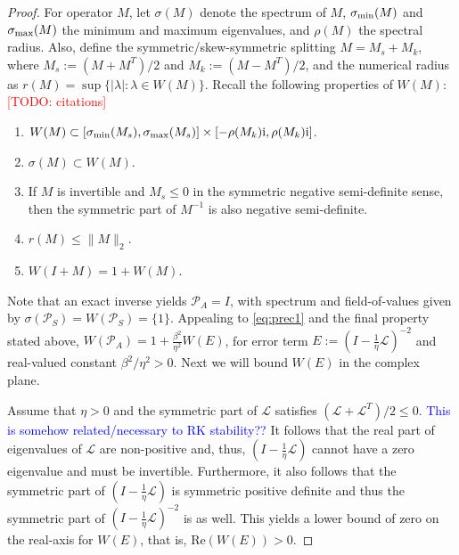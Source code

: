 \documentclass[review]{siamart}
\makeatletter
\newcommand{\tcb}{\textcolor{blue}}
\newcommand{\todo}[1]{\textcolor{red}{[TODO\@: #1]}}
\makeatother
\begin{document}
\begin{proof}
For operator $M$, let $\sigma(M)$ denote the spectrum of $M$, $\sigma_{\textnormal{min}}(M)$
and $\sigma_{\textnormal{max}}(M)$ the minimum and maximum eigenvalues, and $\rho(M)$
the spectral radius. Also, define the symmetric/skew-symmetric splitting
$M = M_s + M_k$, where $M_s := (M+M^T)/2$ and $M_k := (M - M^T)/2$, and the numerical
radius as $r(M) = \sup \{ |\lambda| : \lambda \in W(M) \}$. Recall
the following properties of $W(M)$:\todo{citations}
%
\begin{enumerate}
	\item $W(M)\subset [\sigma_{\textnormal{min}}(M_s), \sigma_{\textnormal{max}}(M_s)] \times
	[-\rho(M_k)\mathrm{i}, \rho(M_k)\mathrm{i}]$.

	\item $\sigma(M) \subset W(M)$.

	\item If $M$ is invertible and $M_s \leq 0$ in the symmetric negative semi-definite
	sense, then the symmetric part of $M^{-1}$ is also negative semi-definite.

	\item $r(M) \leq \|M\|_2$.

	\item $W(I + M) = 1 + W(M)$.
\end{enumerate}
%
Note that an exact inverse yields $\mathcal{P}_A = I$, with spectrum
and field-of-values given by $\sigma(\mathcal{P}_S) = W(\mathcal{P}_S) = \{1\}$.
Appealing to \eqref{eq:prec1} and the final property stated above, $W(\mathcal{P}_A)
= 1 + \tfrac{\beta^2}{\eta^2}W(E)$, for error term $E := (I - \tfrac{1}{\eta}\mathcal{L})^{-2}$
and real-valued constant $\beta^2/\eta^2 > 0$. Next we will bound $W(E)$ in the complex plane.

Assume that $\eta > 0$ and the symmetric part of $\mathcal{L}$ satisfies
$(\mathcal{L}+\mathcal{L}^T)/2 \leq 0$.
\tcb{This is somehow related/necessary to RK stability??}
It follows that the real part of eigenvalues of $\mathcal{L}$ are non-positive and,
thus, $(I - \tfrac{1}{\eta}\mathcal{L})$ cannot have a zero eigenvalue and must be
invertible. Furthermore, it also follows that the symmetric part of
$(I - \tfrac{1}{\eta}\mathcal{L})$ is symmetric positive definite and thus
the symmetric part of $(I - \tfrac{1}{\eta}\mathcal{L})^{-2}$ is as well.
This yields a lower bound of zero on the real-axis for $W(E)$, that is,
Re$(W(E)) > 0$. 


\end{proof}
\end{document}
